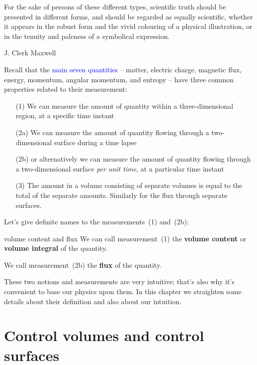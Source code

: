 \documentclass[a4paper,12pt,%
onecolumn,oneside,titlepage,%
british%
]{memoir}
\renewcommand*{\|}[1][]{\nonscript\:#1\vert\nonscript\:\mathopen{}}
\newcommand*{\sect}{\S}%
\renewcommand*{\autoref}[2]{\sidepar{\vspace{-1ex}\footnotesize{\color{blue}\faIcon{%
angle-right%
}\enspace\sect\,\ref{#1} page\,\pageref{#1}}}\textcolor{blue}{#2}}
\begin{document}
\epigraph{For the sake of persons of these different types, scientific truth should be presented in different forms, and should be regarded as equally scientific, whether it appears in the robust form and the vivid colouring of a physical illustration, or in the tenuity and paleness of a symbolical expression.%
}{J. Clerk Maxwell \cites*{maxwell1870}}


Recall that the \autoref{cha:stuff}{main seven quantities} -- matter, electric charge, magnetic flux, energy, momentum, angular momentum, and entropy -- have three common properties related to their measurement:
\begin{enumerate}\color{green}
\item[(1)] We can measure the amount of quantity within a three-dimensional region, at a specific time instant
\item[(2a)] We can measure the amount of quantity flowing through a two-dimensional surface during a time lapse\textellipsis
\item[(2b)] \textellipsis or alternatively we can measure the amount of quantity flowing through a two-dimensional surface \emph{per unit time}, at a particular time instant
\item[(3)]\label{item:extensivity}The amount in a volume consisting of separate volumes is equal to the total of the separate amounts. Similarly for the flux through separate surfaces.
\end{enumerate}

Let's give definite names to the measurements~(1) and~(2b):
\begin{definition}{volume content and flux}
  We can call measurement~(1) the \textbf{volume content} or \textbf{volume integral} of the quantity.

  \smallskip

  We call measurement~(2b) the \textbf{flux} of the quantity. %
\end{definition}

\smallskip

These two notions and measurements are very intuitive; that's also why it's convenient to base our physics upon them. In this chapter we straighten some details about their definition and also about our intuition.

\section{Control volumes and control surfaces}
\label{sec:choice_surfaces}
\end{document}
